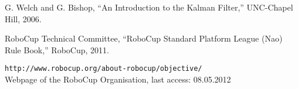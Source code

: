 

\begin{thebibliography}{30}


 G. Welch and G. Bishop, ``An Introduction to the Kalman Filter,'' UNC-Chapel Hill, 2006.

 RoboCup Technical Committee, ``RoboCup Standard Platform League (Nao) Rule Book,'' RoboCup, 2011.

 \texttt{http://www.robocup.org/about-robocup/objective/}\\
Webpage of the RoboCup Organisation, last access:
08.05.2012


\end{thebibliography}
